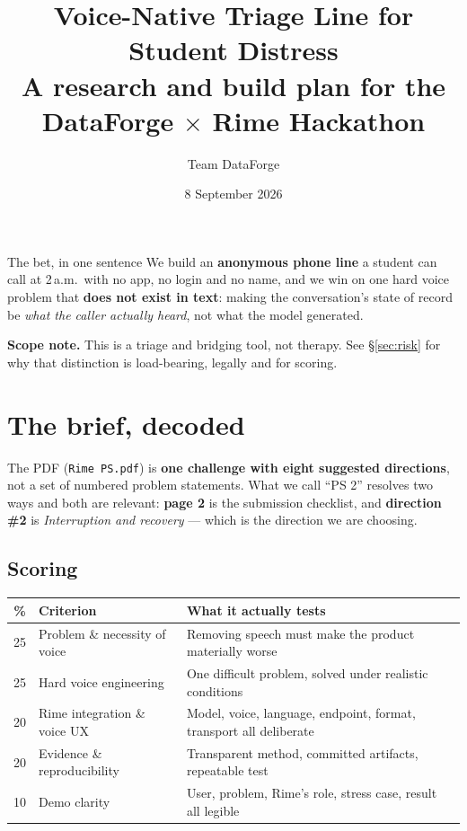 \documentclass[11pt,a4paper]{article}
\title{\vspace{-1.5cm}\textbf{Voice-Native Triage Line for Student Distress}\\
\large A research and build plan for the DataForge $\times$ Rime Hackathon}
\author{\normalsize Team DataForge}
\date{\normalsize 8 September 2026}
\newcommand{\code}[1]{\texttt{\small #1}}
\begin{document}
\maketitle
\thispagestyle{fancy}

\begin{keybox}{The bet, in one sentence}
We build an \textbf{anonymous phone line} a student can call at 2\,a.m.\ with no app,
no login and no name, and we win on one hard voice problem that
\textbf{does not exist in text}: making the conversation's state of record be
\emph{what the caller actually heard}, not what the model generated.
\end{keybox}

\vspace{0.3em}
{\small\color{muted}\textbf{Scope note.} This is a triage and bridging tool, not therapy.
See \S\ref{sec:risk} for why that distinction is load-bearing, legally and for scoring.}

\tableofcontents
\vspace{0.5em}

\section{The brief, decoded}

The PDF (\code{Rime PS.pdf}) is \textbf{one challenge with eight suggested directions},
not a set of numbered problem statements. What we call ``PS 2'' resolves two ways and
both are relevant: \textbf{page 2} is the submission checklist, and
\textbf{direction \#2} is \emph{Interruption and recovery} --- which is the direction
we are choosing.

\subsection{Scoring}

\begin{center}
\begin{tabular}{@{}clp{8.4cm}@{}}
\toprule
\textbf{\%} & \textbf{Criterion} & \textbf{What it actually tests} \\
\midrule
25 & Problem \& necessity of voice & Removing speech must make the product materially worse \\
25 & Hard voice engineering & One difficult problem, solved under realistic conditions \\
20 & Rime integration \& voice UX & Model, voice, language, endpoint, format, transport all deliberate \\
20 & Evidence \& reproducibility & Transparent method, committed artifacts, repeatable test \\
10 & Demo clarity & User, problem, Rime's role, stress case, result all legible \\
\bottomrule
\end{tabular}
\end{center}
\end{document}
